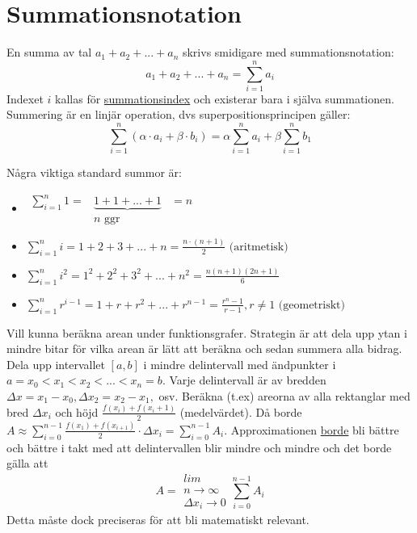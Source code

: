 \chapter{Summationsnotation}
En summa av tal $a_1+a_2+...+a_n$ skrivs smidigare med summationsnotation:
\begin{equation*}
    a_1+a_2+...+a_n=\sum^n_{i=1} a_i
\end{equation*}
Indexet $i$ kallas för \underline{summationsindex} och existerar bara i själva summationen.
Summering är en linjär operation, dvs superpositionsprincipen gäller:
\begin{equation*}
    \sum_{i=1}^n(\alpha\cdot a_i+\beta\cdot b_i)=\alpha\sum_{i=1}^n a_i + \beta\sum_{i=1}^n b_1
\end{equation*}

Några viktiga standard summor är:
\begin{itemize}
    \item $\begin{matrix}
                  \sum_{i=1}^n 1= & \underbrace{1+1+...+1} & =n \\
                                  & n\text{ ggr}           &
              \end{matrix}$
    \item $\sum_{i=1}^n i=1+2+3+...+n=\frac{n\cdot(n+1)}{2}\text{ (aritmetisk)}$
    \item $\sum_{i=1}^n i^2=1^2+2^2+3^2+...+n^2=\frac{n(n+1)(2n+1)}{6}$
    \item $\sum_{i=1}^n r^{i-1}=1+r+r^2+...+r^{n-1}=\frac{r^n -1}{r-1},r\neq 1 \text{ (geometriskt)}$
\end{itemize}

Vill kunna beräkna arean under funktionsgrafer.
Strategin är att dela upp ytan i mindre bitar för vilka arean är lätt att beräkna och sedan summera alla bidrag.\\
Dela upp intervallet $[a,b]$ i mindre delintervall med ändpunkter i $a=x_0<x_1<x_2<...<x_n=b$.
Varje delintervall är av bredden $\Delta x=x_1-x_0,\Delta x_2=x_2-x_1,$ osv.
Beräkna (t.ex) areorna av alla rektanglar med bred $\Delta x_i$ och höjd $\frac{f(x_i)+f(x_i+1)}{2}$ (medelvärdet).
Då borde $A\approx \sum_{i=0}^{n-1}\frac{f(x_1)+f(x_{i+1})}{2}\cdot\Delta x_i=\sum_{i=0}^{n-1} A_i$.
Approximationen \underline{borde} bli bättre och bättre i takt med att delintervallen blir mindre och mindre och det borde gälla att
\begin{equation*}
    A=\begin{matrix}
        lim        \\
        n\to\infty \\
        \Delta x_i\to 0
    \end{matrix}\sum_{i=0}^{n-1}A_i
\end{equation*}
Detta måste dock preciseras för att bli matematiskt relevant.

